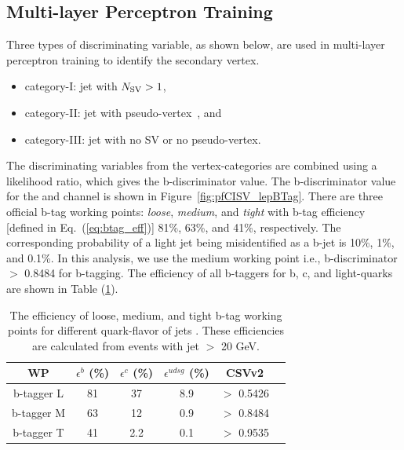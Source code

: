 \subsection{Multi-layer Perceptron Training}
Three types of discriminating variable, as shown below, are used in multi-layer perceptron training to identify the secondary vertex.
\begin{itemize}
    \item category-I: jet with $N_{\rm SV} > 1$,
    \item category-II: jet with pseudo-vertex~\cite{CMS-PAS-BTV-15-001}, and
    \item category-III: jet with no SV or no pseudo-vertex.
\end{itemize}
The discriminating variables from the vertex-categories are combined using a likelihood ratio,
which gives the b-discriminator value.
The b-discriminator value for the \mujets and \ejets channel is shown in
Figure~\ref{fig:pfCISV_lepBTag}.
There are three official b-tag working points: {\em loose}, {\em medium}, and {\em tight} with
b-tag efficiency [defined in Eq.~(\ref{eq:btag_eff})] 81\%, 63\%, and 41\%, respectively.
The corresponding probability of a light jet being misidentified as a b-jet is 10\%, 1\%, and 0.1\%.
In this analysis, we use the medium working point i.e., b-discriminator $>$ 0.8484 for b-tagging.
The efficiency of all b-taggers for b, c, and light-quarks are shown in Table (\ref{tab:bTagEff}). 
\begin{table}
\begin{center}
\caption{The efficiency of loose, medium, and tight b-tag working points for different quark-flavor
    of jets \cite{Sirunyan:2017ezt}. These efficiencies are calculated from
\ttbar events with jet \pt $>$ 20 GeV.}
\begin{tabular}{cccccc}
\hline
\hline
WP & $\epsilon^b$ (\%) & $\epsilon^c$ (\%) & $\epsilon^{udsg}$ (\%)& CSVv2 \\ \hline\hline
b-tagger L & 81 & 37 & 8.9 & $>$ 0.5426  \\
b-tagger M & 63 & 12 & 0.9 & $>$ 0.8484   \\
b-tagger T & 41 & 2.2& 0.1 & $>$ 0.9535   \\
\hline
\end{tabular}
\label{tab:bTagEff}
\end{center}
\end{table}

